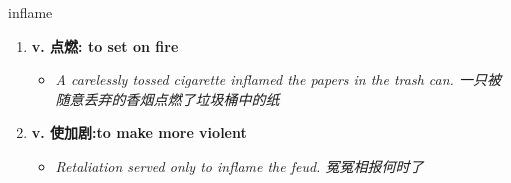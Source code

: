 
\begin{frame}
{\huge inflame}
\begin{center}
\begin{enumerate}\Large
  \item \textbf{v. 点燃: to set on fire}
  \begin{itemize}
    \item \em{\Large{A carelessly tossed cigarette inflamed the papers in the trash can. 一只被随意丢弃的香烟点燃了垃圾桶中的纸}}
  \end{itemize}
  \item \textbf{v. 使加剧:to make more violent}
  \begin{itemize}
    \item \em{\Large{Retaliation served only to inflame the feud. 冤冤相报何时了}}
  \end{itemize}
\end{enumerate}
\end{center}
\end{frame}
